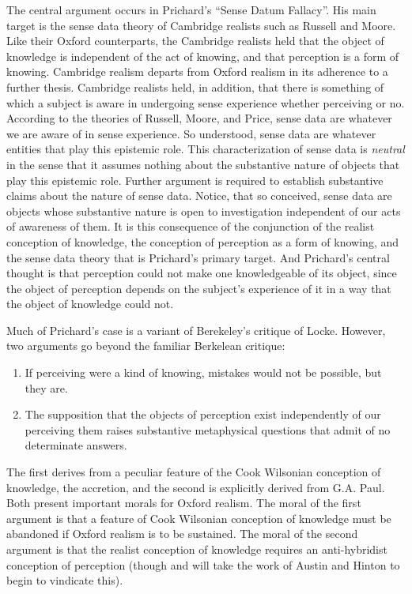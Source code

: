 \documentclass[11pt]{article}
\begin{document}
The central argument occurs in Prichard's \citeyearpar{Prichard:1938ve} ``Sense Datum Fallacy''. His main target is the sense data theory of Cambridge realists such as Russell and Moore. Like their Oxford counterparts, the Cambridge realists held that the object of knowledge is independent of the act of knowing, and that perception is a form of knowing. Cambridge realism departs from Oxford realism in its adherence to a further thesis. Cambridge realists held, in addition, that there is something of which a subject is aware in undergoing sense experience whether perceiving or no. According to the theories of Russell, Moore, and Price, sense data are whatever we are aware of in sense experience. So understood, sense data are whatever entities that play this epistemic role. This characterization of sense data is \emph{neutral} in the sense that it assumes nothing about the substantive nature of objects that play this epistemic role. Further argument is required to establish substantive claims about the nature of sense data. Notice, that so conceived, sense data are objects whose substantive nature is open to investigation independent of our acts of awareness of them. It is this consequence of the conjunction of the realist conception of knowledge, the conception of perception as a form of knowing, and the sense data theory that is Prichard's primary target. And Prichard's central thought is that perception could not make one knowledgeable of its object, since the object of perception depends on the subject's experience of it in a way that the object of knowledge could not.

Much of Prichard's case is a variant of Berekeley's critique of Locke. However, two arguments go beyond the familiar Berkelean critique:
\begin{enumerate}
	\item If perceiving were a kind of knowing, mistakes would not be possible, but they are.
	\item The supposition that the objects of perception exist independently of our perceiving them raises substantive metaphysical questions that admit of no determinate answers.
\end{enumerate}
The first derives from a peculiar feature of the Cook Wilsonian conception of knowledge, the accretion, and the second is explicitly derived from G.A. Paul. Both present important morals for Oxford realism. The moral of the first argument is that a feature of Cook Wilsonian conception of knowledge must be abandoned if Oxford realism is to be sustained. The moral of the second argument is that the realist conception of knowledge requires an anti-hybridist conception of perception (though and will take the work of Austin and Hinton to begin to vindicate this).
\end{document}
